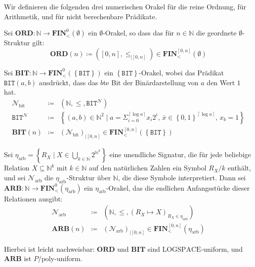 Wir definieren die folgenden drei numerischen Orakel für die reine
Ordnung, für Arithmetik, und für nicht berechenbare Prädikate.
\begin{defn}
\textbf{\label{def:ord}}Sei $\mathbf{ORD}:\mathbb{N}\rightarrow\mathbf{FIN}_{<}^{0}\left(\emptyset\right)$
ein $\emptyset$-Orakel, so dass das für $n\in\mathbb{N}$ die geordnete
$\emptyset$-Struktur gilt: 
\[
\mathbf{ORD}\left(n\right)\coloneqq\left(\left[0,n\right],\leqslant_{\mid\left[0,n\right]}\right)\in\mathbf{FIN}_{<}^{\left[0,n\right]}\left(\emptyset\right)
\]
\end{defn}
%
\begin{defn}
\textbf{\label{def:bit}}Sei $\mathbf{BIT}:\mathbb{N}\rightarrow\mathbf{FIN}_{<}^{0}\left(\left\{ \mathtt{BIT}\right\} \right)$
ein $\left\{ \mathtt{BIT}\right\} $-Orakel, wobei das Prädikat $\mathtt{BIT}\left(a,b\right)$
ausdrückt, dass das $b$te Bit der Binärdarstellung von $a$ den Wert
$1$ hat. 
\begin{eqnarray*}
\mathcal{N}_{\mathrm{bit}} & \coloneqq & \left(\mathbb{N},\leqslant,\mathtt{BIT}^{\mathcal{N}}\right)\\
\mathtt{BIT}^{\mathcal{N}} & \coloneqq & \left\{ \left(a,b\right)\in\mathbb{N}^{2}\mid a=\Sigma_{i=0}^{\left\lceil \log a\right\rceil }x_{i}2^{i},\,\bar{x}\in\left\{ 0,1\right\} ^{\left\lceil \log a\right\rceil },\,x_{b}=1\right\} \\
\mathbf{BIT}\left(n\right) & \coloneqq & \left(\mathcal{N}_{\mathrm{bit}}\right)_{\mid\left[0,n\right]}\in\mathbf{FIN}_{<}^{\left[0,n\right]}\left(\left\{ \mathtt{BIT}\right\} \right)
\end{eqnarray*}
\end{defn}
%
\begin{defn}
\label{def:arb}Sei $\eta_{\mathrm{arb}}=\left\{ R_{X}\mid X\in\bigcup_{k\in\mathbb{N}}2^{\mathbb{N}^{k}}\right\} $
eine unendliche Signatur, die für jede beliebige Relation $X\subseteq\mathbb{N}^{k}$
mit $k\in\mathbb{N}$ auf den natürlichen Zahlen ein Symbol $R_{X}/k$
enthält, und sei $\mathcal{N}_{\mathrm{arb}}$ die $\eta_{\mathrm{arb}}$-Struktur
über $\mathbb{N}$, die diese Symbole interpretiert. Dann sei $\mathbf{ARB}:\mathbb{N}\rightarrow\mathbf{FIN}_{<}^{0}\left(\eta_{\mathrm{arb}}\right)$
ein $\eta_{\mathrm{arb}}$-Orakel, das die endlichen Anfangsstücke
dieser Relationen ausgibt:
\begin{eqnarray*}
\mathcal{N}_{\mathrm{arb}} & \coloneqq & \left(\mathbb{N},\leqslant,\left(R_{X}\mapsto X\right)_{R_{X}\in\eta_{\mathrm{arb}}}\right)\\
\mathbf{ARB}\left(n\right) & \coloneqq & \left(\mathcal{N}_{\mathrm{arb}}\right)_{\mid\left[0,n\right]}\in\mathbf{FIN}_{<}^{\left[0,n\right]}\left(\eta_{\mathrm{arb}}\right)
\end{eqnarray*}

Hierbei ist leicht nachweisbar: $\mathbf{ORD}$ und $\mathbf{BIT}$
sind $\mathrm{LOGSPACE}$-uniform, und $\mathbf{ARB}$ ist $P/\mathrm{poly}$-uniform.
\end{defn}


